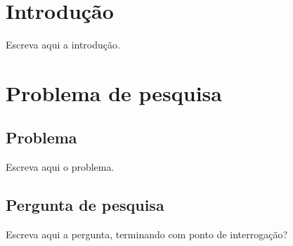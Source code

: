 \documentclass[12pt,a4paper]{article}
\begin{document}
\section{Introdução}
%
%
%

Escreva aqui a introdução.

\section{Problema de pesquisa}

\subsection{Problema}
%

Escreva aqui o problema.

\subsection{Pergunta de pesquisa}
%

Escreva aqui a pergunta, terminando com ponto de interrogação?
\end{document}
